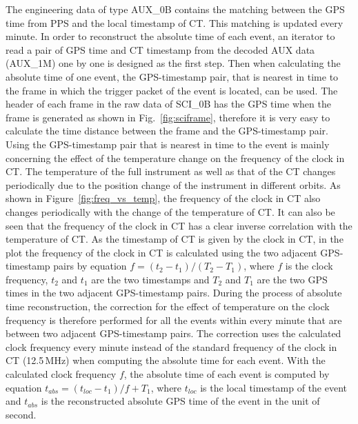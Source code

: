 \documentclass{raa}
\begin{document}
The engineering data of type AUX\_0B contains the matching between the GPS time from PPS and the local timestamp of CT. This matching is updated every minute. In order to reconstruct the absolute time of each event, an iterator to read a pair of GPS time and CT timestamp from the decoded AUX data (AUX\_1M) one by one is designed as the first step. Then when calculating the absolute time of one event, the GPS-timestamp pair, that is nearest in time to the frame in which the trigger packet of the event is located, can be used. The header of each frame in the raw data of SCI\_0B has the GPS time when the frame is generated as shown in Fig.~\ref{fig:sciframe}, therefore it is very easy to calculate the time distance between the frame and the GPS-timestamp pair. Using the GPS-timestamp pair that is nearest in time to the event is mainly concerning the effect of the temperature change on the frequency of the clock in CT. The temperature of the full instrument as well as that of the CT changes periodically due to the position change of the instrument in different orbits. As shown in Figure~\ref{fig:freq_vs_temp}, the frequency of the clock in CT also changes periodically with the change of the temperature of CT. It can also be seen that the frequency of the clock in CT has a clear inverse correlation with the temperature of CT. As the timestamp of CT is given by the clock in CT, in the plot the frequency of the clock in CT is calculated using the two adjacent GPS-timestamp pairs by equation $f = (t_2 - t_1) / (T_2 - T_1)$, where $f$ is the clock frequency, $t_2$ and $t_1$ are the two timestamps and $T_2$ and $T_1$ are the two GPS times in the two adjacent GPS-timestamp pairs. During the process of absolute time reconstruction, the correction for the effect of temperature on the clock frequency is therefore performed for all the events within every minute that are between two adjacent GPS-timestamp pairs. The correction uses the calculated clock frequency every minute instead of the standard frequency of the clock in CT (12.5\,MHz) when computing the absolute time for each event. With the calculated clock frequency $f$, the absolute time of each event is computed by equation $t_{abs} = (t_{loc} - t_1) / f + T_1$, where $t_{loc}$ is the local timestamp of the event and $t_{abs}$ is the reconstructed absolute GPS time of the event in the unit of second.
\end{document}
